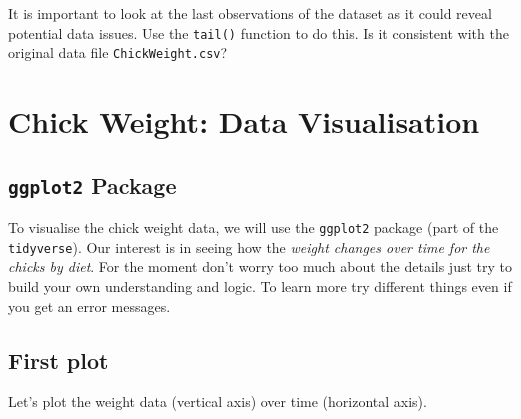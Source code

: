 \documentclass[letterpaperpaper,9pt,twocolumn,twoside,printwatermark=false]{pinp}
\begin{document}
It is important to look at the last observations of the dataset as it
could reveal potential data issues. Use the \texttt{tail()} function to
do this. Is it consistent with the original data file
\texttt{ChickWeight.csv}?

\hypertarget{chick-weight-data-visualisation}{%
\section{Chick Weight: Data
Visualisation}\label{chick-weight-data-visualisation}}

\hypertarget{ggplot2-package}{%
\subsection{\texorpdfstring{\texttt{ggplot2}
Package}{ggplot2 Package}}\label{ggplot2-package}}

To visualise the chick weight data, we will use the \texttt{ggplot2}
package (part of the \texttt{tidyverse}). Our interest is in seeing how
the \emph{weight changes over time for the chicks by diet}. For the
moment don't worry too much about the details just try to build your own
understanding and logic. To learn more try different things even if you
get an error messages.

\hypertarget{first-plot}{%
\subsection{First plot}\label{first-plot}}

Let's plot the weight data (vertical axis) over time (horizontal axis).

\begin{Shaded}
\begin{Highlighting}[]
\OperatorTok{+}\StringTok{ }\NormalTok{() }
\end{Highlighting}
\end{Shaded}
\end{document}
